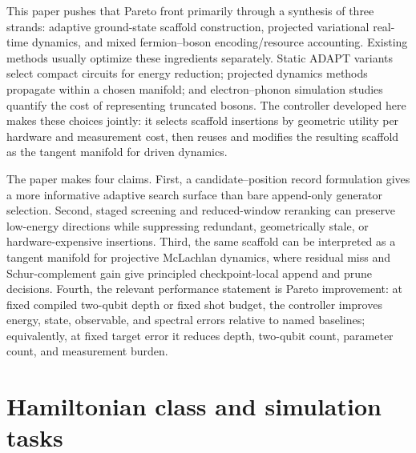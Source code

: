 \documentclass[
  reprint,
  amsmath,
  amssymb,
  aps,
  pra,
  nofootinbib,
  superscriptaddress,
  floatfix
]{revtex4-2}
\begin{document}
This paper pushes that Pareto front primarily through a synthesis of three strands: adaptive ground-state scaffold construction, projected variational real-time dynamics, and mixed fermion--boson encoding/resource accounting. Existing methods usually optimize these ingredients separately. Static ADAPT variants select compact circuits for energy reduction; projected dynamics methods propagate within a chosen manifold; and electron--phonon simulation studies quantify the cost of representing truncated bosons. The controller developed here makes these choices jointly: it selects scaffold insertions by geometric utility per hardware and measurement cost, then reuses and modifies the resulting scaffold as the tangent manifold for driven dynamics.

The paper makes four claims. First, a candidate--position record formulation gives a more informative adaptive search surface than bare append-only generator selection. Second, staged screening and reduced-window reranking can preserve low-energy directions while suppressing redundant, geometrically stale, or hardware-expensive insertions. Third, the same scaffold can be interpreted as a tangent manifold for projective McLachlan dynamics, where residual miss and Schur-complement gain give principled checkpoint-local append and prune decisions. Fourth, the relevant performance statement is Pareto improvement: at fixed compiled two-qubit depth or fixed shot budget, the controller improves energy, state, observable, and spectral errors relative to named baselines; equivalently, at fixed target error it reduces depth, two-qubit count, parameter count, and measurement burden.

\section{Hamiltonian class and simulation tasks}
\label{sec:hamiltonians}
\end{document}
